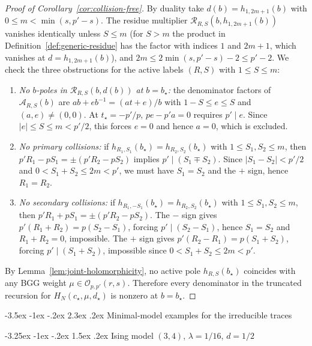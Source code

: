 \documentclass[twoside,10pt]{article}
\makeatletter
\numberwithin{equation}{section}
\theoremstyle{slbody}
\theoremstyle{definition}
\theoremstyle{remark}
\renewcommand{\section}{%
  \@startsection{section}{1}{\z@}%
    {-3.5ex \@plus -1ex \@minus -.2ex}%
    {2.3ex \@plus .2ex}%
    {\normalfont\large\bfseries}}
\renewcommand{\subsection}{%
  \@startsection{subsection}{2}{\z@}%
    {-3.25ex \@plus -1ex \@minus -.2ex}%
    {1.5ex \@plus .2ex}%
    {\normalfont\normalsize\bfseries}}
\makeatother
\begin{document}
\begin{proof}[Proof of Corollary~\ref{cor:collision-free}]
By duality take \(d(b)=h_{1,2m+1}(b)\) with \(0\leq m<\min(s,p'-s)\).  The
residue multiplier \(\mathcal{R}_{R,S}(b,h_{1,2m+1}(b))\) vanishes identically
unless \(S\leq m\) (for \(S>m\) the product in
Definition~\ref{def:generic-residue} has the factor with indices \(1\) and
\(2m+1\), which vanishes at \(d=h_{1,2m+1}(b)\)),
and \(2m\leq2\min(s,p'-s)-2\leq p'-2\).  We check
the three obstructions for the active labels \((R,S)\) with \(1\leq S\leq m\):
\begin{enumerate}
 \item \emph{No \(b\)-poles in \(\mathcal{R}_{R,S}(b,d(b))\) at \(b=b_\star\):}
   the denominator factors of \(\mathcal{A}_{R,S}(b)\) are \(ab+eb^{-1}=(at+e)/b\) with
   \(1-S\leq e\leq S\) and \((a,e)\neq(0,0)\).  At \(t_\star=-p'/p\),
   \(pe-p'a=0\) requires \(p'\mid e\).  Since \(|e|\leq S\leq m<p'/2\), this
   forces \(e=0\) and hence \(a=0\), which is excluded.
 \item \emph{No primary collisions:}
   if \(h_{R_1,S_1}(b_\star)=h_{R_2,S_2}(b_\star)\) with
   \(1\leq S_1,S_2\leq m\), then \(p'R_1-pS_1=\pm(p'R_2-pS_2)\) implies
   \(p'\mid(S_1\mp S_2)\).  Since \(|S_1-S_2|<p'/2\) and
   \(0<S_1+S_2\leq 2m<p'\), we must have \(S_1=S_2\) and the \(+\) sign, hence
   \(R_1=R_2\).
 \item \emph{No secondary collisions:}
   if \(h_{R_1,-S_1}(b_\star)=h_{R_2,S_2}(b_\star)\) with
   \(1\leq S_1,S_2\leq m\), then \(p'R_1+pS_1=\pm(p'R_2-pS_2)\).  The \(-\)
   sign gives \(p'(R_1+R_2)=p(S_2-S_1)\), forcing \(p'\mid(S_2-S_1)\), hence
   \(S_1=S_2\) and \(R_1+R_2=0\), impossible.  The \(+\) sign gives
   \(p'(R_2-R_1)=p(S_1+S_2)\), forcing \(p'\mid(S_1+S_2)\), impossible since
   \(0<S_1+S_2\leq 2m<p'\).
\end{enumerate}
By Lemma~\ref{lem:joint-holomorphicity}, no active pole
\(h_{R,S}(b_\star)\) coincides with any BGG weight
\(\mu\in\mathcal{O}_{p,p'}(r,s)\).  Therefore every denominator in the
truncated recursion for \(H_N(c_\star,\mu,d_\star)\) is nonzero at
\(b=b_\star\).
\end{proof}

\section{Minimal-model examples for the irreducible traces}\label{sec:examples}

\subsection{Ising model \texorpdfstring{\((3,4)\), \(\lambda=1/16\), \(d=1/2\)}{(3,4), lambda=1/16, d=1/2}}
\end{document}
